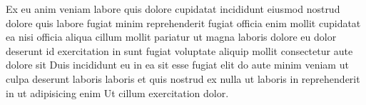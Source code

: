 Ex eu anim veniam labore quis dolore cupidatat incididunt eiusmod nostrud dolore quis labore fugiat minim reprehenderit fugiat officia enim mollit cupidatat ea nisi officia aliqua cillum mollit pariatur ut magna laboris dolore eu dolor deserunt id exercitation in sunt fugiat voluptate aliquip mollit consectetur aute dolore sit Duis incididunt eu in ea sit esse fugiat elit do aute minim veniam ut culpa deserunt laboris laboris et quis nostrud ex nulla ut laboris in reprehenderit in ut adipisicing enim Ut cillum exercitation dolor.

